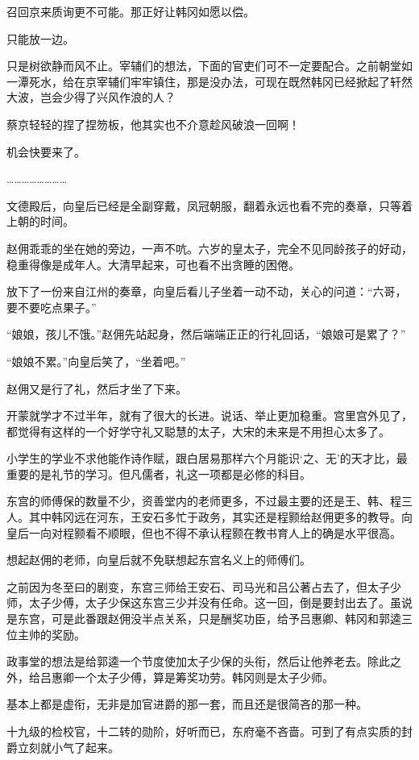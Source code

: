 召回京来质询更不可能。那正好让韩冈如愿以偿。

只能放一边。

只是树欲静而风不止。宰辅们的想法，下面的官吏们可不一定要配合。之前朝堂如一潭死水，给在京宰辅们牢牢镇住，那是没办法，可现在既然韩冈已经掀起了轩然大波，岂会少得了兴风作浪的人？

蔡京轻轻的捏了捏笏板，他其实也不介意趁风破浪一回啊！

机会快要来了。

……………………

文德殿后，向皇后已经是全副穿戴，凤冠朝服，翻着永远也看不完的奏章，只等着上朝的时间。

赵佣乖乖的坐在她的旁边，一声不吭。六岁的皇太子，完全不见同龄孩子的好动，稳重得像是成年人。大清早起来，可也看不出贪睡的困倦。

放下了一份来自江州的奏章，向皇后看儿子坐着一动不动，关心的问道：“六哥，要不要吃点果子。”

“娘娘，孩儿不饿。”赵佣先站起身，然后端端正正的行礼回话，“娘娘可是累了？”

“娘娘不累。”向皇后笑了，“坐着吧。”

赵佣又是行了礼，然后才坐了下来。

开蒙就学才不过半年，就有了很大的长进。说话、举止更加稳重。宫里宫外见了，都觉得有这样的一个好学守礼又聪慧的太子，大宋的未来是不用担心太多了。

小学生的学业不求他能作诗作赋，跟白居易那样六个月能识‘之、无’的天才比，最重要的是礼节的学习。但凡儒者，礼这一项都是必修的科目。

东宫的师傅保的数量不少，资善堂内的老师更多，不过最主要的还是王、韩、程三人。其中韩冈远在河东，王安石多忙于政务，其实还是程颢给赵佣更多的教导。向皇后一向对程颢看不顺眼，但也不得不承认程颢在教书育人上的确是水平很高。

想起赵佣的老师，向皇后就不免联想起东宫名义上的师傅们。

之前因为冬至曰的剧变，东宫三师给王安石、司马光和吕公著占去了，但太子少师，太子少傅，太子少保这东宫三少并没有任命。这一回，倒是要封出去了。虽说是东宫，可是此番跟赵佣没半点关系，只是酬奖功臣，给予吕惠卿、韩冈和郭逵三位主帅的奖励。

政事堂的想法是给郭逵一个节度使加太子少保的头衔，然后让他养老去。除此之外，给吕惠卿一个太子少傅，算是筹奖功劳。韩冈则是太子少师。

基本上都是虚衔，无非是加官进爵的那一套，而且还是很简吝的那一种。

十九级的检校官，十二转的勋阶，好听而已，东府毫不吝啬。可到了有点实质的封爵立刻就小气了起来。

